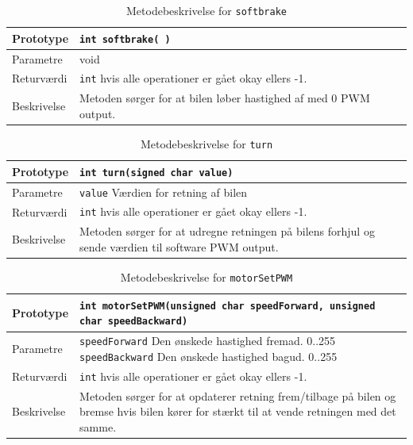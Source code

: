 \begin{table}[H]
	\begin{tabularx}{\textwidth}{| L{2.5 cm} | Z |} \hline
		Prototype & \texttt{int softbrake( )} \\\hline
		Parametre & void
		\\\hline
		Returværdi &  \texttt{int}  hvis alle operationer er gået okay ellers -1. \\\hline
		Beskrivelse & Metoden sørger for at bilen løber hastighed af med 0 PWM output. \\\hline
	\end{tabularx}
	\caption{Metodebeskrivelse for \texttt{softbrake}}
	\label{table:met_softbrake}
\end{table}

\begin{table}[H]
	\begin{tabularx}{\textwidth}{| L{2.5 cm} | Z |} \hline
		Prototype & \texttt{int turn(signed char value)} \\\hline
		Parametre & \texttt{value} \newline
		Værdien for retning af bilen
		\\\hline
		Returværdi &  \texttt{int}  hvis alle operationer er gået okay ellers -1. \\\hline
		Beskrivelse & Metoden sørger for at udregne retningen på bilens forhjul og sende værdien til software PWM output. \\\hline
	\end{tabularx}
	\caption{Metodebeskrivelse for \texttt{turn}}
	\label{table:met_turn}
\end{table}

\begin{table}[H]
	\begin{tabularx}{\textwidth}{| L{2.5 cm} | Z |} \hline
		Prototype & \texttt{int motorSetPWM(unsigned char speedForward, unsigned char speedBackward)} \\\hline
		Parametre & \texttt{speedForward} \newline Den ønskede hastighed fremad. 0..255\newline
		\texttt{speedBackward} \newline Den ønskede hastighed bagud. 0..255
		\\\hline
		Returværdi &  \texttt{int}  hvis alle operationer er gået okay ellers -1. \\\hline
		Beskrivelse & Metoden sørger for at opdaterer retning frem/tilbage på bilen og bremse hvis bilen kører for stærkt til at vende retningen med det samme. \\\hline
	\end{tabularx}
	\caption{Metodebeskrivelse for \texttt{motorSetPWM}}
	\label{table:met_motorSetPWM}
\end{table}

